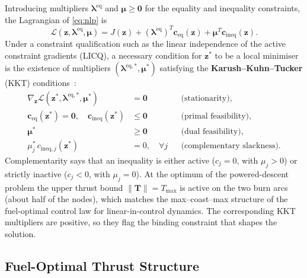 \documentclass[../main.tex]{subfiles}
\begin{document}
Introducing multipliers $\boldsymbol{\lambda}^{\mathrm{eq}}$ and $\boldsymbol{\mu} \geq \mathbf{0}$ for the equality and inequality constraints, the Lagrangian of \eqref{eq:nlp} is
\begin{equation}
    \mathcal{L}(\mathbf{z},\boldsymbol{\lambda}^{\mathrm{eq}},\boldsymbol{\mu})
    = J(\mathbf{z}) + (\boldsymbol{\lambda}^{\mathrm{eq}})^T \mathbf{c}_{\mathrm{eq}}(\mathbf{z})
                    + \boldsymbol{\mu}^T \mathbf{c}_{\mathrm{ineq}}(\mathbf{z}).
\end{equation}
Under a constraint qualification such as the linear independence of the active constraint gradients (LICQ), a necessary condition for $\mathbf{z}^*$ to be a local minimiser is the existence of multipliers $(\boldsymbol{\lambda}^{\mathrm{eq},*},\boldsymbol{\mu}^*)$ satisfying the \textbf{Karush--Kuhn--Tucker} (KKT) conditions~\cite[Sec.~5.5.3]{boyd2004}:
\begin{align}
    \nabla_{\mathbf{z}} \mathcal{L}(\mathbf{z}^*,\boldsymbol{\lambda}^{\mathrm{eq},*},\boldsymbol{\mu}^*) &= \mathbf{0}
        && \text{(stationarity),}\\
    \mathbf{c}_{\mathrm{eq}}(\mathbf{z}^*) = \mathbf{0},\quad \mathbf{c}_{\mathrm{ineq}}(\mathbf{z}^*) &\leq \mathbf{0}
        && \text{(primal feasibility),}\\
    \boldsymbol{\mu}^* &\geq \mathbf{0}
        && \text{(dual feasibility),}\\
    \mu_j^*\, c_{\mathrm{ineq},j}(\mathbf{z}^*) &= 0,\quad \forall j
        && \text{(complementary slackness).}
\end{align}
Complementarity says that an inequality is either active ($c_j = 0$, with $\mu_j > 0$) or strictly inactive ($c_j < 0$, with $\mu_j = 0$). At the optimum of the powered-descent problem the upper thrust bound $\|\mathbf{T}\| = T_{\max}$ is active on the two burn arcs (about half of the nodes), which matches the max--coast--max structure of the fuel-optimal control law for linear-in-control dynamics. The corresponding KKT multipliers are positive, so they flag the binding constraint that shapes the solution.

\subsection{Fuel-Optimal Thrust Structure}\label{sec:bangbang}
\end{document}
